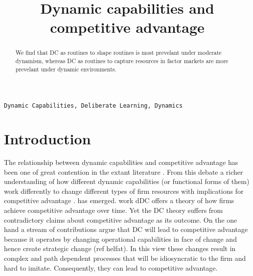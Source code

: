 \documentclass[review,fleqn]{elsarticle}\usepackage[]{graphicx}\usepackage[]{color}
\begin{document}
\begin{frontmatter}


\title{Dynamic capabilities and competitive advantage}





\begin{abstract}
 We find that DC as routines to shape routines is most prevelant under moderate dynamism,
whereas DC as routines to capture resources in factor markets are more prevelant under
dynamic environments.

\end{abstract}

\begin{keyword}
\texttt{Dynamic Capabilities, Deliberate Learning, Dynamics }
\end{keyword}

\end{frontmatter}



\doublespacing


\section{Introduction}

The relationship between dynamic capabilities and competitive advantage has been one of
great contention in the extant literature \citep{Peteraf2013,Ambrosini2009}. From this
debate a richer understanding of how different dynamic capabilities (or functional forms
of them) work differently to change different types of firm resources
\citep{Helfat2015a,Teece2007,Ambrosini2009a} with implications for competitive advantage
\citep{Peteraf2013}.  has emerged.  work dDC offers a theory of how firms achieve
competitive advantage over time. Yet the DC theory suffers from contradictory claims about
competitive advantage as its outcome. On the one hand a stream of contributions argue that
DC will lead to competitive advantage because it operates by changing operational
capabilities in face of change and hence create strategic change (ref helfat). In this
view these changes result in complex and path dependent processes that will be
idiosyncratic to the firm and hard to imitate. Consequently, they can lead to competitive
advantage.
\end{document}
